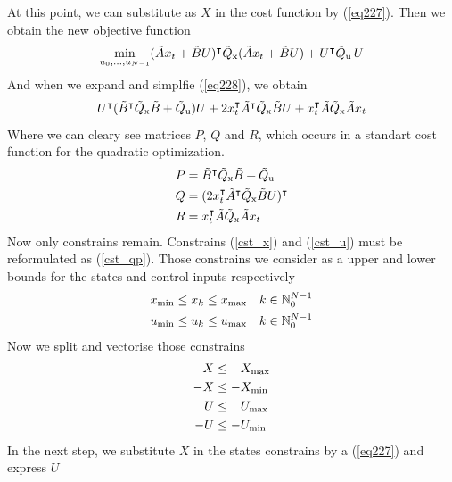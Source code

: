 At this point, we can substitute as $X$ in the cost function by (\ref{eq227}). Then we obtain the new objective function
\begin{equation}\label{eq228}
	\min_{u_0,...,u_{N-1}} (\tilde{A}x_t + \tilde{B}U)^\intercal\tilde{Q} _{\text{x}}(\tilde{A}x_t + \tilde{B}U) + U^\intercal\tilde{Q} _{\text{u}}\,U\\
\end{equation}
And when we expand and simplfie (\ref{eq228}), we obtain
\begin{equation}
	U^\intercal(\tilde{B}^\intercal\tilde{Q} _{\text{x}}\tilde{B} + \tilde{Q} _{\text{u}})U + 2x_t^\intercal\tilde{A}^\intercal\tilde{Q} _{\text{x}}\tilde{B}U + x_t^\intercal\tilde{A}\tilde{Q} _{\text{x}}\tilde{A}x_t
\end{equation}
Where we can cleary see matrices $P$, $Q$ and $R$, which occurs in a standart cost function for the quadratic optimization.
\begin{subequations}
	\begin{align}
		P &= \tilde{B}^\intercal\tilde{Q} _{\text{x}}\tilde{B} + \tilde{Q} _{\text{u}}\\
		Q &= (2x_t^\intercal\tilde{A}^\intercal\tilde{Q} _{\text{x}}\tilde{B}U)^\intercal\\
		R &= x_t^\intercal\tilde{A}\tilde{Q} _{\text{x}}\tilde{A}x_t
	\end{align}
\end{subequations}
Now only constrains remain. Constrains (\ref{cst_x}) and (\ref{cst_u}) must be reformulated as (\ref{cst_qp}). Those constrains we consider as a upper and lower bounds for the states and control inputs respectively
\begin{subequations}
	\begin{align}
		x _{\text{min}} &\leq x_k \leq x _{\text{max}} \quad k \in \mathbb{N}_0^{N-1}\\
		u _{\text{min}} &\leq u_k \leq u _{\text{max}} \quad k \in \mathbb{N}_0^{N-1}
	\end{align}
\end{subequations}
Now we split and vectorise those constrains
\begin{subequations}
\begin{align}
	X &\leq \ \; \, X _{\text{max}}\\
	-X &\leq -X _{\text{min}}\\
	U &\leq \ \; \, U _{\text{max}}\\
	-U &\leq -U _{\text{min}}
\end{align}
\end{subequations}
In the next step, we substitute $X$ in the states constrains by a (\ref{eq227}) and express $U$
